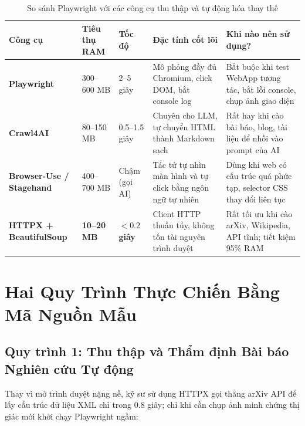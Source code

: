 \documentclass[a4paper,11pt]{article}
\begin{document}
\begin{table}[htbp]
\centering
\small
\caption{So sánh Playwright với các công cụ thu thập và tự động hóa thay thế}
\vspace{0.5em}
\begin{tabularx}{\textwidth}{L{2.5cm} L{2cm} L{2.2cm} L{3.5cm} Y}
\toprule
\textbf{Công cụ} & \textbf{Tiêu thụ RAM} & \textbf{Tốc độ} & \textbf{Đặc tính cốt lõi} & \textbf{Khi nào nên sử dụng?} \\
\midrule
\textbf{Playwright} & 300--600 MB & 2--5 giây & Mô phỏng đầy đủ Chromium, click DOM, bắt console log & Bắt buộc khi test WebApp tương tác, bắt lỗi console, chụp ảnh giao diện \\
\textbf{Crawl4AI} & 80--150 MB & 0.5--1.5 giây & Chuyên cho LLM, tự chuyển HTML thành Markdown sạch & Rất hay khi cào bài báo, blog, tài liệu để nhồi vào prompt của AI \\
\textbf{Browser-Use / Stagehand} & 400--700 MB & Chậm (gọi AI) & Tác tử tự nhìn màn hình và tự click bằng ngôn ngữ tự nhiên & Dùng khi web có cấu trúc quá phức tạp, selector CSS thay đổi liên tục \\
\textbf{HTTPX + BeautifulSoup} & \textbf{10--20 MB} & \textbf{$< 0.2$ giây} & Client HTTP thuần túy, không tốn tài nguyên trình duyệt & Rất tối ưu khi cào arXiv, Wikipedia, API tĩnh; tiết kiệm 95\% RAM \\
\bottomrule
\end{tabularx}
\end{table}

\section{Hai Quy Trình Thực Chiến Bằng Mã Nguồn Mẫu}

\subsection{Quy trình 1: Thu thập và Thẩm định Bài báo Nghiên cứu Tự động}
Thay vì mở trình duyệt nặng nề, kỹ sư sử dụng HTTPX gọi thẳng arXiv API để lấy cấu trúc dữ liệu XML chỉ trong 0.8 giây; chỉ khi cần chụp ảnh minh chứng thị giác mới khởi chạy Playwright ngầm:
\end{document}
